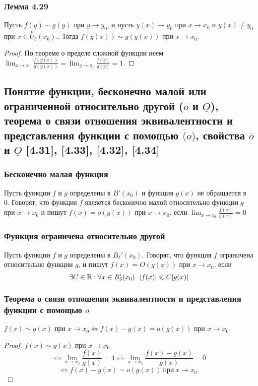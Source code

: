 \documentclass[12pt, a4paper]{article}
\begin{document}
    \subsubsection{Лемма 4.29}
    Пусть $f(y) \sim g(y)$ при $y \to y_0$, и пусть $y(x) \to y_0$ при $x \to x_0$ и $y(x) \ne y_0$ при $x \in \overset{o}{U}_{\delta}(x_0).$. Тогда $f(y(x)) \sim g(y(x))$ при $x \to x_0$.
    \begin{proof}
    По теореме о пределе сложной функции иеем $\lim_{x \to x_0} \frac{f(y(x))}{g(y(x))} = \lim_{y \to y_0} \frac{f(y)}{g(y)} = 1.$
    \end{proof}
    \subsection{Понятие функции, бесконечно малой или ограниченной относительно другой ($\overline{o}$ и $\underline{O}$), теорема о связи отношения эквивалентности и представления функции с помощью $\overline(o)$, свойства $\overline{o}$ и $\underline{O}$ [4.31], [4.33], [4.32], [4.34]}
    \subsubsection{Бесконечно малая функция}
     Пусть функции $f$ и $g$ определены в $B'(x_0)$ и функция $g(x)$ не обращается в 0. Говорят, что функция $f$ является бесконечно малой относительно функции $g$ при $x \to x_0$ и пишут $f(x) = o(g(x))$ при $x \to x_0$, если $\lim_{x \to x_0} \frac{f(x)}{g(x)}=0$
    \subsubsection{Функция ограничена относительно другой}
    Пусть функции $f$ и $g$ определены в $B_{\delta}' (x_0)$. Говорят, что функция $f$ ограничена относительно функции $g$, и пишут $f(x)$ = $O(g(x))$ при $x \to x_0$, если 
    \begin{equation*}
        \exists C \in \mathbb{R} : \forall x \in B_{\delta}' (x_0) \ \ |f(x)| \leqslant C|g(x)|
    \end{equation*}
    \subsubsection{Теорема о связи отношения эквивалентности и представления функции с помощью $o$}
    $f(x) \sim g(x)$ при $x \to x_0 \Leftrightarrow f(x) - g(x) = o(g(x))$ при $x \to x_0$.
    \begin{proof}
    $f(x) \sim g(x)$ при $x \to x_0$
    \begin{equation*}
        \Longleftrightarrow \lim_{x \to x_0} \frac{f(x)}{g(x)} = 1 \Longleftrightarrow \lim_{x \to x_0} \frac{f(x) - g(x)}{g(x)} = 0
    \end{equation*}
    \begin{equation*}
        \Longleftrightarrow f(x) - g(x) = o(g(x)) \ \text{при} \ x \to x_0.
    \end{equation*}
    \end{proof}
\end{document}
